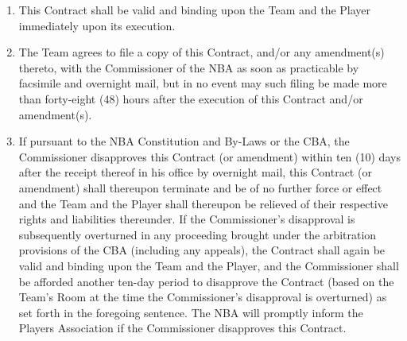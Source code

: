 \documentclass[
]{book}
\providecommand{\tightlist}{%
  \setlength{\itemsep}{0pt}\setlength{\parskip}{0pt}}
\begin{document}
\begin{enumerate}
\def\labelenumi{(\alph{enumi})}
\tightlist
\item
  This Contract shall be valid and binding upon the Team and the Player immediately upon its execution.
\item
  The Team agrees to file a copy of this Contract, and/or any amendment(s) thereto, with the Commissioner of the NBA as soon as practicable by facsimile and overnight mail, but in no event may such filing be made more than forty-eight (48) hours after the execution of this Contract and/or amendment(s).
\item
  If pursuant to the NBA Constitution and By-Laws or the CBA, the Commissioner disapproves this Contract (or amendment) within ten (10) days after the receipt thereof in his office by overnight mail, this Contract (or amendment) shall thereupon terminate and be of no further force or effect and the Team and the Player shall thereupon be relieved of their respective rights and liabilities thereunder. If the Commissioner's disapproval is subsequently overturned in any proceeding brought under the arbitration provisions of the CBA (including any appeals), the Contract shall again be valid and binding upon the Team and the Player, and the Commissioner shall be afforded another ten-day period to disapprove the Contract (based on the Team's Room at the time the Commissioner's disapproval is overturned) as set forth in the foregoing sentence. The NBA will promptly inform the Players Association if the Commissioner disapproves this Contract.
\end{enumerate}
\end{document}
